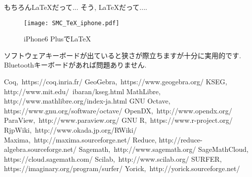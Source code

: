 \documentclass[b5j,8pt,twocolumn]{ltjsarticle}
\begin{document}
もちろん{\LaTeX}だって... そう, {\LaTeX}だって....
\newline

\begin{figure}[htbp]
\begin{center}
\texttt{[image: SMC\_TeX\_iphone.pdf]}
\caption{iPhone6 Plusで{\LaTeX}}
\label{fig:smctex}
\end{center}
\end{figure}

ソフトウェアキーボードが出ていると狭さが際立ちますが十分に実用的です.
 Bluetoothキーボードがあれば問題ありません. 

\begin{thebibliography}{99}
Coq,~https://coq.inria.fr/
GeoGebra,~https://www.geogebra.org/
KSEG,
\newline
http://www.mit.edu/~ibaran/kseg.html
MathLibre,
\newline
http://www.mathlibre.org/index-ja.html
GNU Octave,
\newline
https://www.gnu.org/software/octave/
OpenDX,~http://www.opendx.org/
ParaView,~http://www.paraview.org/
GNU R,~https://www.r-project.org/
RjpWiki,~http://www.okada.jp.org/RWiki/
Maxima,~http://maxima.sourceforge.net/
Reduce,\newline
http://reduce-algebra.sourceforge.net/
Sagemath,~http://www.sagemath.org/
SageMathCloud,\newline
https://cloud.sagemath.com/
Scilab,~http://www.scilab.org/
SURFER,\newline
https://imaginary.org/program/surfer/
Yorick,~http://yorick.sourceforge.net/
\end{thebibliography}
\end{document}
